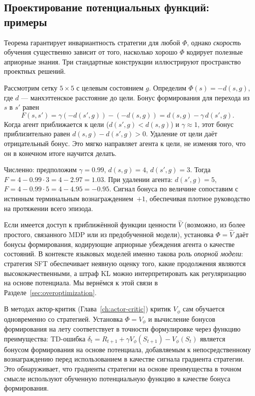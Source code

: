 \subsection{Проектирование потенциальных функций: примеры}

Теорема гарантирует инвариантность стратегии для любой $\Phi$, однако \emph{скорость} обучения существенно зависит от того, насколько хорошо $\Phi$ кодирует полезные априорные знания. Три стандартные конструкции иллюстрируют пространство проектных решений.

\begin{example}
\label{ex:grid-potential}
Рассмотрим сетку $5\times 5$ с целевым состоянием $g$. Определим $\Phi(s) = -d(s, g)$, где $d$ --- манхэттенское расстояние до цели. Бонус формирования для перехода из $s$ в $s'$ равен
\[
F(s, s') = \gamma(-d(s',g)) - (-d(s,g)) = d(s,g) - \gamma\,d(s',g).
\]
Когда агент приближается к цели ($d(s',g) < d(s,g)$) и $\gamma \approx 1$, этот бонус приблизительно равен $d(s,g) - d(s',g) > 0$. Удаление от цели даёт отрицательный бонус. Это мягко направляет агента к цели, не изменяя того, что он в конечном итоге научится делать.

Численно: предположим $\gamma = 0.99$, $d(s,g) = 4$, $d(s',g) = 3$. Тогда $F = 4 - 0.99 \cdot 3 = 4 - 2.97 = 1.03$. При удалении агента: $d(s',g) = 5$, $F = 4 - 0.99 \cdot 5 = 4 - 4.95 = -0.95$. Сигнал бонуса по величине сопоставим с истинным терминальным вознаграждением~$+1$, обеспечивая плотное руководство на протяжении всего эпизода.
\end{example}

\begin{example}
\label{ex:vf-potential}
Если имеется доступ к приближённой функции ценности $\hat{V}$ (возможно, из более простого, связанного MDP или из предобученной модели), установка $\Phi = \hat{V}$ даёт бонусы формирования, кодирующие априорные убеждения агента о качестве состояний. В контексте языковых моделей именно такова роль \emph{опорной модели}: стратегия SFT обеспечивает неявную оценку того, какие продолжения являются высококачественными, а штраф KL можно интерпретировать как регуляризацию на основе потенциала. Мы вернёмся к этой связи в Разделе~\ref{sec:overoptimization}.
\end{example}

\begin{example}
\label{ex:critic-potential}
В методах актор-критик (Глава~\ref{ch:actor-critic}) критик $V_\phi$ сам обучается одновременно со стратегией. Установка $\Phi = V_\phi$ и вычисление бонусов формирования на лету соответствует в точности формулировке через функцию преимущества: TD-ошибка $\delta_t = R_{t+1} + \gamma V_\phi(S_{t+1}) - V_\phi(S_t)$ является бонусом формирования на основе потенциала, добавляемым к непосредственному вознаграждению перед использованием в качестве сигнала градиента стратегии. Это обнаруживает, что градиенты стратегии на основе преимущества в точном смысле используют обученную потенциальную функцию в качестве бонуса формирования.
\end{example}

